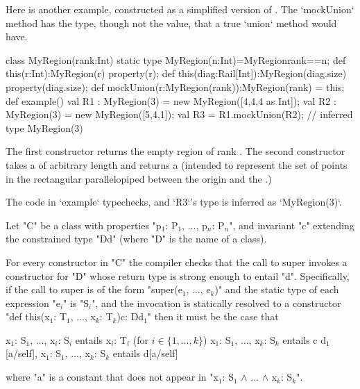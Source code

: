 \begin{ex}
Here is another example, constructed as a simplified 
version of .  The \xcd`mockUnion` method 
has the type, though not the value, that a true \xcd`union` method would have.

\begin{xten}
class MyRegion(rank:Int) {
  static type MyRegion(n:Int)=MyRegion{rank==n};
  def this(r:Int):MyRegion(r) {
    property(r);
  }
  def this(diag:Rail[Int]):MyRegion(diag.size){ 
    property(diag.size);
  }
  def mockUnion(r:MyRegion(rank)):MyRegion(rank) = this;
  def example() {
    val R1 : MyRegion(3) = new MyRegion([4,4,4 as Int]); 
    val R2 : MyRegion(3) = new MyRegion([5,4,1]); 
    val R3 = R1.mockUnion(R2); // inferred type MyRegion(3)
  }
}
\end{xten}
%
The first constructor returns the empty region of rank .  The
second constructor takes a  of arbitrary length
 and returns a  (intended to represent the set
of points in the rectangular parallelopiped between the origin and the
.)

The code in \xcd`example` typechecks, and \xcd`R3`'s type is inferred as
\xcd`MyRegion(3)`.  


\end{ex}

   Let \xcd"C" be a class with properties
   \xcdmath"p$_1$: P$_1$, $\dots$, p$_n$: P$_n$", and invariant \xcd"c"
   extending the constrained type \xcd"D{d}" (where \xcd"D" is the name of a
   class).



   For every constructor in \xcd"C" the compiler checks that the call to
   super invokes a constructor for \xcd"D" whose return type is strong enough
   to entail \xcd"d". Specifically, if the call to super is of the form 
     \xcdmath"super(e$_1$, $\dots$, e$_k$)"
   and the static type of each expression \xcdmath"e$_i$" is
   \xcdmath"S$_i$", and the invocation
   is statically resolved to a constructor
\xcdmath"def this(x$_1$: T$_1$, $\dots$, x$_k$: T$_k$){c}: D{d$_1$}"
   then it must be the case that 
\begin{xtenmath}
x$_1$: S$_1$, $\dots$, x$_i$: S$_i$ entails x$_i$: T$_i$  (for $i \in \{1, \dots, k\}$)
x$_1$: S$_1$, $\dots$, x$_k$: S$_k$ entails c  
d$_1$[a/self], x$_1$: S$_1$, ..., x$_k$: S$_k$ entails d[a/self]      
\end{xtenmath}
\noindent where \xcd"a" is a constant that does not appear in 
\xcdmath"x$_1$: S$_1$ $\wedge$ ... $\wedge$ x$_k$: S$_k$".

